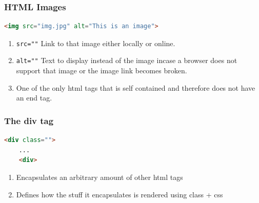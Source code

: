 \documentclass{beamer}
\begin{document}
%
%
\begin{frame}[fragile]
    \frametitle{HTML Images}
    \begin{lstlisting}[language=html, basicstyle=\scriptsize]
  <img src="img.jpg" alt="This is an image">
    \end{lstlisting} 
    \vfill
    \begin{enumerate}[A]
        \item \lstinline|src=""| Link to that image either locally or online.
        \item \lstinline|alt=""| Text to display instead of the image incase a browser does not support that image or the image link becomes broken.
        \item One of the only html tags that is self contained and therefore does not have an end tag.
    \end{enumerate}
\end{frame}


%
%
\begin{frame}[fragile]
    \frametitle{The div tag}
    \begin{lstlisting}[language=html, basicstyle=\scriptsize, autogobble]
    <div class=""> 
    ...
    <div>
    \end{lstlisting} 
    \vfill
    \begin{enumerate}[A]
        \item Encapsulates an arbitrary amount of other html tags
        \item Defines how the stuff it encapsulates is rendered using class + css
    \end{enumerate}
\end{frame}
\end{document}
